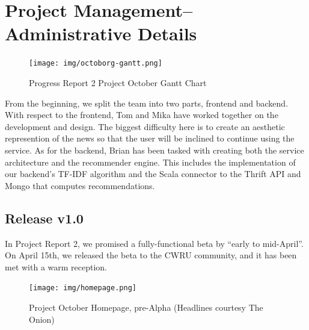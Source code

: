 \documentclass[11pt,letterpaper]{article}
\begin{document}
\section{Project Management--Administrative Details}

\begin{figure}
\centering
\texttt{[image: img/octoborg-gantt.png]}
\caption{Progress Report 2 Project October Gantt Chart}
\label{fig:gantt}
\end{figure}

From the beginning, we split the team into two parts, frontend and backend.
With respect to the frontend, Tom and Mika have worked together on the development and design.
The biggest difficulty here is to create an aesthetic represention of the news so that the user will be inclined to continue using the service.
As for the backend, Brian has been tasked with creating both the service architecture and the recommender engine.
This includes the implementation of our backend's TF-IDF algorithm and the Scala connector to the Thrift API and Mongo that computes recommendations.

\subsection{Release v1.0}
\label{sec:release1.0}
In Project Report 2, we promised a fully-functional beta by ``early to mid-April''.
On April 15th, we released the beta to the CWRU community, and it has been met with a warm reception.

\begin{figure}
\centering
\texttt{[image: img/homepage.png]}
\caption{Project October Homepage, pre-Alpha (Headlines courtesy The Onion)}
\label{fig:homepage}
\end{figure}
\end{document}
